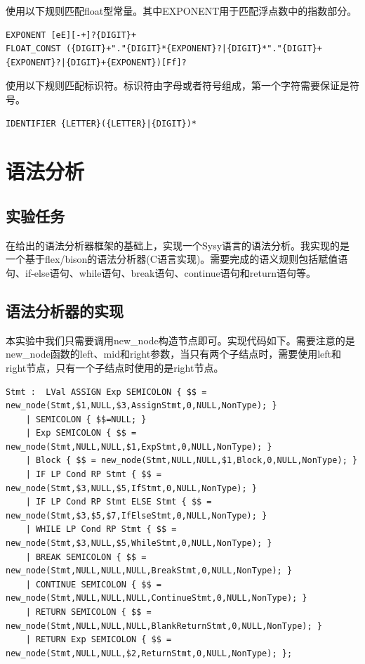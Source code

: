 \documentclass[supercite]{Experimental_Report}
\theoremstyle{definition}
\begin{document}
使用以下规则匹配float型常量。其中EXPONENT用于匹配浮点数中的指数部分。
\begin{lstlisting}[float=htb]
EXPONENT [eE][-+]?{DIGIT}+
FLOAT_CONST ({DIGIT}+"."{DIGIT}*{EXPONENT}?|{DIGIT}*"."{DIGIT}+{EXPONENT}?|{DIGIT}+{EXPONENT})[Ff]?
\end{lstlisting}

使用以下规则匹配标识符。标识符由字母或者符号组成，第一个字符需要保证是符号。
\begin{lstlisting}[]
IDENTIFIER {LETTER}({LETTER}|{DIGIT})*
\end{lstlisting}
\newpage
\section{语法分析}
\subsection{实验任务}
在给出的语法分析器框架的基础上，实现一个Sysy语言的语法分析。我实现的是一个基于flex/bison的语法分析器(C语言实现)。需要完成的语义规则包括赋值语句、if-else语句、while语句、break语句、continue语句和return语句等。
\subsection{语法分析器的实现}
本实验中我们只需要调用new\_node构造节点即可。实现代码如下。需要注意的是new\_node函数的left、mid和right参数，当只有两个子结点时，需要使用left和right节点，只有一个子结点时使用的是right节点。

\begin{lstlisting}[float=htb]
Stmt :  LVal ASSIGN Exp SEMICOLON { $$ = new_node(Stmt,$1,NULL,$3,AssignStmt,0,NULL,NonType); }
    | SEMICOLON { $$=NULL; }
    | Exp SEMICOLON { $$ = new_node(Stmt,NULL,NULL,$1,ExpStmt,0,NULL,NonType); }
    | Block { $$ = new_node(Stmt,NULL,NULL,$1,Block,0,NULL,NonType); }
    | IF LP Cond RP Stmt { $$ = new_node(Stmt,$3,NULL,$5,IfStmt,0,NULL,NonType); }
    | IF LP Cond RP Stmt ELSE Stmt { $$ = new_node(Stmt,$3,$5,$7,IfElseStmt,0,NULL,NonType); }
    | WHILE LP Cond RP Stmt { $$ = new_node(Stmt,$3,NULL,$5,WhileStmt,0,NULL,NonType); }
    | BREAK SEMICOLON { $$ = new_node(Stmt,NULL,NULL,NULL,BreakStmt,0,NULL,NonType); }
    | CONTINUE SEMICOLON { $$ = new_node(Stmt,NULL,NULL,NULL,ContinueStmt,0,NULL,NonType); }
    | RETURN SEMICOLON { $$ = new_node(Stmt,NULL,NULL,NULL,BlankReturnStmt,0,NULL,NonType); }
    | RETURN Exp SEMICOLON { $$ = new_node(Stmt,NULL,NULL,$2,ReturnStmt,0,NULL,NonType); };
\end{lstlisting}
\newpage
\end{document}
